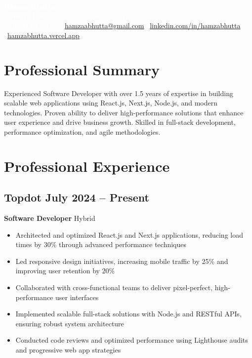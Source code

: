 \documentclass[11pt]{article}
\makeatletter
\newcommand{\resumeHeader}[4]{
    \begin{center}
        \vspace*{5pt}
        \colorbox{headercolor}{\parbox{0.95\textwidth}{
            \vspace{8pt}
            \begin{center}
                \textcolor{white}{\LARGE\bfseries #1} \\[5pt]
                \textcolor{white}{\large Software Developer \textbullet{} #2} \\[3pt]
                \textcolor{white}{\normalsize
                    \faPhone~#3 \textbullet{}
                    \faEnvelope~\href{mailto:hamzaabhutta@gmail.com}{hamzaabhutta@gmail.com} \textbullet{}
                    \faLinkedin~\href{https://www.linkedin.com/in/hamzabhutta}{linkedin.com/in/hamzabhutta} \textbullet{}
                    \faGlobe~\href{https://hamzabhutta.vercel.app/}{hamzabhutta.vercel.app}
                }
            \end{center}
            \vspace{8pt}
        }}
        \vspace{10pt}
    \end{center}
}
\makeatother
\begin{document}
\pagestyle{empty} %
\RaggedRight %

\resumeHeader{Hamza Bhutta}{Remote Available Globally}{+92 311 1208388}{}

\section{Professional Summary}
Experienced Software Developer with over 1.5 years of expertise in building scalable web applications using React.js, Next.js, Node.js, and modern technologies. Proven ability to deliver high-performance solutions that enhance user experience and drive business growth. Skilled in full-stack development, performance optimization, and agile methodologies.

\section{Professional Experience}
\subsection{\texorpdfstring{Topdot \hfill July 2024 -- Present}{Topdot, July 2024 -- Present}}
\textbf{Software Developer} \hfill Hybrid
\begin{itemize}
\item Architected and optimized React.js and Next.js applications, reducing load times by 30\% through advanced performance techniques
\item Led responsive design initiatives, increasing mobile traffic by 25\% and improving user retention by 20\%
\item Collaborated with cross-functional teams to deliver pixel-perfect, high-performance user interfaces
\item Implemented scalable full-stack solutions with Node.js and RESTful APIs, ensuring robust system architecture
\item Conducted code reviews and optimized performance using Lighthouse audits and progressive web app strategies
\end{itemize}
\end{document}
